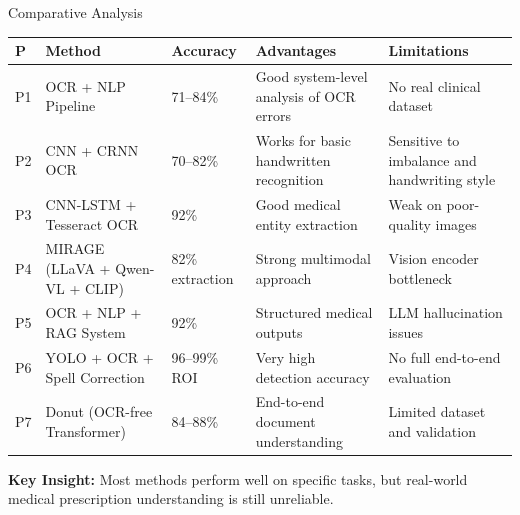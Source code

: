\documentclass[11pt,aspectratio=169]{beamer}
\begin{document}
\begin{frame}{Comparative Analysis}
\vspace{0.3cm}

\scriptsize
\centering

\renewcommand{\arraystretch}{1.2}

\begin{tabular}{|m{0.5cm}|m{3.2cm}|m{1.6cm}|m{3.2cm}|m{3.2cm}|}

\hline

\rowcolor{medixPrimary}
\color{white}\textbf{P} &
\color{white}\textbf{Method} &
\color{white}\textbf{Accuracy} &
\color{white}\textbf{Advantages} &
\color{white}\textbf{Limitations}
\\

\hline

P1 & OCR + NLP Pipeline & 71--84\% & Good system-level analysis of OCR errors & No real clinical dataset \\
\hline

P2 & CNN + CRNN OCR & 70--82\% & Works for basic handwritten recognition & Sensitive to imbalance and handwriting style \\
\hline

P3 & CNN-LSTM + Tesseract OCR & 92\% & Good medical entity extraction & Weak on poor-quality images \\
\hline

P4 & MIRAGE (LLaVA + Qwen-VL + CLIP) & 82\% extraction & Strong multimodal approach & Vision encoder bottleneck \\
\hline

P5 & OCR + NLP + RAG System & 92\% & Structured medical outputs & LLM hallucination issues \\
\hline

P6 & YOLO + OCR + Spell Correction & 96--99\% ROI & Very high detection accuracy & No full end-to-end evaluation \\
\hline

P7 & Donut (OCR-free Transformer) & 84--88\% & End-to-end document understanding & Limited dataset and validation \\
\hline

\end{tabular}

\vspace{0.2cm}

\textbf{Key Insight:} Most methods perform well on specific tasks, but real-world medical prescription understanding is still unreliable.

\end{frame}
\end{document}
